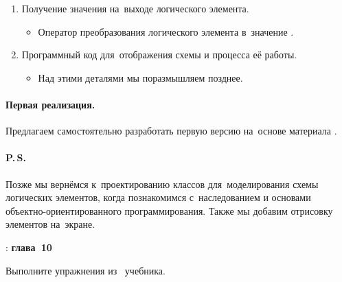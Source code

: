 \begin{enumerate}
    \item Получение значения на~выходе логического элемента.
    \begin{itemize}
        \item Оператор преобразования логического элемента в~значение .
    \end{itemize}

    \item Программный код для~отображения схемы и процесса её работы.
    \begin{itemize}
        \item Над этими деталями мы поразмышляем позднее.
    \end{itemize}
\end{enumerate}



\paragraph{Первая реализация.}
Предлагаем самостоятельно разработать первую версию на~основе материала .



\paragraph{P.\,S.}
Позже мы вернёмся к~проектированию классов для~моделирования схемы логических элементов, когда познакомимся с~наследованием и основами объектно-ориентированного программирования. Также мы добавим отрисовку элементов на~экране.



\WhatToReadSection
\textcite{Stroustrup:2016:ru}: \textbf{глава~10}



\ExercisesSection
\begin{exercise}
\item Выполните упражнения из~ учебника.

\end{exercise}
